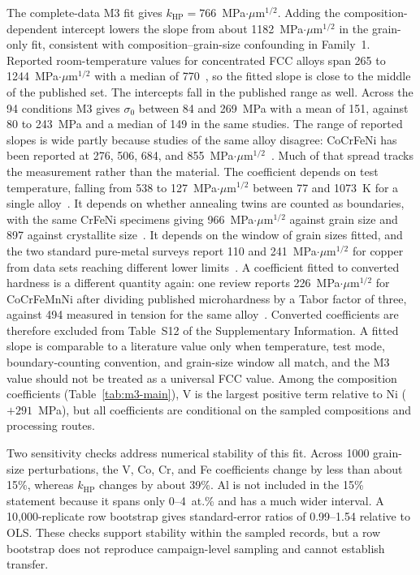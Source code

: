 \documentclass[5p,times,twocolumn]{elsarticle}
\begin{document}
The complete-data M3 fit gives $k_{\mathrm{HP}}=766$~MPa$\cdot\mu$m$^{1/2}$. Adding the composition-dependent intercept lowers the slope from about 1182~MPa$\cdot\mu$m$^{1/2}$ in the grain-only fit, consistent with composition--grain-size confounding in Family~1. Reported room-temperature values for concentrated FCC alloys span 265 to 1244~MPa$\cdot\mu$m$^{1/2}$ with a median of 770~\cite{Yoshida2017,Otto2013,Yoshida2019acta,SchneiderCrFeNi2021,LiKHP2024,Jagetia2021}, so the fitted slope is close to the middle of the published set. The intercepts fall in the published range as well. Across the 94 conditions M3 gives $\sigma_0$ between 84 and 269~MPa with a mean of 151, against 80 to 243~MPa and a median of 149 in the same studies. The range of reported slopes is wide partly because studies of the same alloy disagree: CoCrFeNi has been reported at 276, 506, 684, and 855~MPa$\cdot\mu$m$^{1/2}$~\cite{Yoshida2019acta,LiKHP2024,Jagetia2021,WuGaoBei2016}. Much of that spread tracks the measurement rather than the material. The coefficient depends on test temperature, falling from 538 to 127~MPa$\cdot\mu$m$^{1/2}$ between 77 and 1073~K for a single alloy~\cite{Otto2013}. It depends on whether annealing twins are counted as boundaries, with the same CrFeNi specimens giving 966~MPa$\cdot\mu$m$^{1/2}$ against grain size and 897 against crystallite size~\cite{SchneiderCrFeNi2021}. It depends on the window of grain sizes fitted, and the two standard pure-metal surveys report 110 and 241~MPa$\cdot\mu$m$^{1/2}$ for copper from data sets reaching different lower limits~\cite{Cordero2016,Figueiredo2023}. A coefficient fitted to converted hardness is a different quantity again: one review reports 226~MPa$\cdot\mu$m$^{1/2}$ for CoCrFeMnNi after dividing published microhardness by a Tabor factor of three, against 494 measured in tension for the same alloy~\cite{LiRitchieMeyers2019,Otto2013}. Converted coefficients are therefore excluded from Table~S12 of the Supplementary Information. A fitted slope is comparable to a literature value only when temperature, test mode, boundary-counting convention, and grain-size window all match, and the M3 value should not be treated as a universal FCC value. Among the composition coefficients (Table~\ref{tab:m3-main}), V is the largest positive term relative to Ni ($+291$~MPa), but all coefficients are conditional on the sampled compositions and processing routes.

Two sensitivity checks address numerical stability of this fit. Across 1000 grain-size perturbations, the V, Co, Cr, and Fe coefficients change by less than about 15\%, whereas $k_{\mathrm{HP}}$ changes by about 39\%. Al is not included in the 15\% statement because it spans only 0--4~at.\% and has a much wider interval. A 10,000-replicate row bootstrap gives standard-error ratios of 0.99--1.54 relative to OLS. These checks support stability within the sampled records, but a row bootstrap does not reproduce campaign-level sampling and cannot establish transfer.
\end{document}
